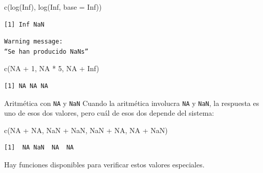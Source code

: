 \documentclass[
  ignorenonframetext,
  aspectratio=169,
  spanish,
]{beamer}
\newenvironment{Shaded}{\begin{snugshade}}{\end{snugshade}}
\newcommand{\AttributeTok}[1]{\textcolor[rgb]{0.40,0.45,0.13}{#1}}
\newcommand{\ConstantTok}[1]{\textcolor[rgb]{0.56,0.35,0.01}{#1}}
\newcommand{\DecValTok}[1]{\textcolor[rgb]{0.68,0.00,0.00}{#1}}
\newcommand{\FunctionTok}[1]{\textcolor[rgb]{0.28,0.35,0.67}{#1}}
\newcommand{\NormalTok}[1]{\textcolor[rgb]{0.00,0.23,0.31}{#1}}
\newcommand{\SpecialCharTok}[1]{\textcolor[rgb]{0.37,0.37,0.37}{#1}}
\begin{document}
\begin{frame}[fragile]{}
\label{section-4}
\begin{Shaded}
\begin{Highlighting}[]
\FunctionTok{c}\NormalTok{(}\FunctionTok{log}\NormalTok{(}\ConstantTok{Inf}\NormalTok{), }\FunctionTok{log}\NormalTok{(}\ConstantTok{Inf}\NormalTok{, }\AttributeTok{base =} \ConstantTok{Inf}\NormalTok{)) }
\end{Highlighting}
\end{Shaded}

\begin{verbatim}
[1] Inf NaN
\end{verbatim}

\begin{verbatim}
Warning message:
“Se han producido NaNs”
\end{verbatim}

\begin{Shaded}
\begin{Highlighting}[]
\FunctionTok{c}\NormalTok{(}\ConstantTok{NA} \SpecialCharTok{+} \DecValTok{1}\NormalTok{, }\ConstantTok{NA} \SpecialCharTok{*} \DecValTok{5}\NormalTok{, }\ConstantTok{NA} \SpecialCharTok{+} \ConstantTok{Inf}\NormalTok{)  }
\end{Highlighting}
\end{Shaded}

\begin{verbatim}
[1] NA NA NA
\end{verbatim}
\end{frame}

\begin{frame}[fragile]{Aritmética con \texttt{NA} y \texttt{NaN}}
\label{aritmuxe9tica-con-na-y-nan}
Cuando la aritmética involucra \texttt{NA} y \texttt{NaN}, la respuesta
es uno de esos dos valores, pero cuál de esos dos depende del sistema:

\begin{Shaded}
\begin{Highlighting}[]
\FunctionTok{c}\NormalTok{(}\ConstantTok{NA} \SpecialCharTok{+} \ConstantTok{NA}\NormalTok{, }\ConstantTok{NaN} \SpecialCharTok{+} \ConstantTok{NaN}\NormalTok{, }\ConstantTok{NaN} \SpecialCharTok{+} \ConstantTok{NA}\NormalTok{, }\ConstantTok{NA} \SpecialCharTok{+} \ConstantTok{NaN}\NormalTok{)}
\end{Highlighting}
\end{Shaded}

\begin{verbatim}
[1]  NA NaN  NA  NA
\end{verbatim}

Hay funciones disponibles para verificar estos valores especiales.
\end{frame}
\end{document}
